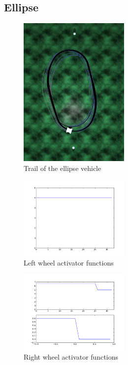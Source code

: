 \documentclass[a4paper]{article}
\begin{document}
\subsection{Ellipse}
\begin{figure}
	\begin{center}
		\includegraphics[width=0.48\textwidth]{trail/ellipse.png}
	\end{center}
	\caption{Trail of the ellipse vehicle}
\end{figure}

\begin{figure}
	\begin{center}
		\includegraphics[width=0.48\textwidth]{graphs/activators/ellipse_l.png}
	\end{center}
	\caption{Left wheel activator functions}
\end{figure}

\begin{figure}
	\begin{center}
		\includegraphics[width=0.48\textwidth]{graphs/activators/ellipse_r.png}
	\end{center}
	\caption{Right wheel activator functions}
\end{figure}
\end{document}
